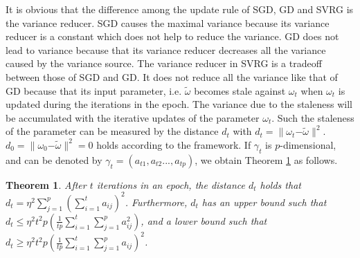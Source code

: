 \documentclass[letterpaper]{article}
\begin{document}
It is obvious that the difference among the update rule of SGD, GD and SVRG is the variance reducer. SGD causes the maximal variance because its variance reducer is a constant which does not help to reduce the variance. GD does not lead to variance because that its variance reducer decreases all the variance caused by the variance source. The variance reducer in SVRG is a tradeoff  between those of SGD and GD. It does not reduce all the variance like that of GD because that its input parameter, i.e. $\tilde{\omega}$ becomes stale against $\omega_{t}$  when   $\omega_{t}$  is updated during the iterations in the epoch. The variance due to the staleness will be accumulated with the iterative updates of the parameter $\omega_{t}$.   Such the staleness of the parameter can be measured by  the distance $d_t$ with $d_t = \parallel \omega_{t} \mathrm{-} \tilde{\omega} \parallel^2$. $d_0 = \parallel \omega_{0}\mathrm{-}\tilde{\omega}\parallel^2 = 0$ holds according to the framework. If $\gamma_t$ is $p$-dimensional, and can be denoted by  $\gamma_t = (a_{t1}, a_{t2}..., a_{tp})$, we obtain Theorem \ref{theorem_vr_lower_bound}  as follows.


\newtheorem{Theorem}{\bf{Theorem}}
\newtheorem{Corollary}{\bf{Corollary}}
\newtheorem{Lemma}{\bf{Lemma}}
\newtheorem{Assumption}{\bf{Assumption}}


\begin{Theorem}
\label{theorem_vr_lower_bound}
   After $t$ iterations in an epoch, the distance $d_t$ holds that $d_t \mathrm{=} \eta^2 \sum\limits_{j=1}^p\left(  \sum\limits_{i=1}^t a_{ij}  \right)^2$. Furthermore, $d_t$ has an upper bound such that 
   $d_t \mathrm{\le} \eta^2 t^2p  \left( \frac{1}{tp}\sum\limits_{i=1}^t   \sum\limits_{j=1}^p   a_{ij}^2 \right)$, and a lower bound such that $d_t  \mathrm{\ge} \eta^2t^2p \left(\frac{1}{tp}\sum\limits_{i=1}^t   \sum\limits_{j=1}^p   a_{ij}\right)^2$.
\end{Theorem}
\end{document}
